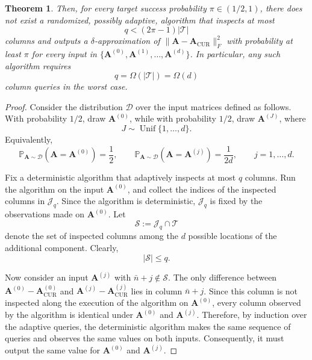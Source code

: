\documentclass[10pt,a4paper]{amsart}
\newtheorem{theorem}{Theorem}
\begin{document}
\begin{theorem}
    Then, for every target success probability $\pi\in(1/2,1)$, there does not
    exist a randomized, possibly adaptive, algorithm that inspects at most
    \begin{equation}
        q < (2\pi-1)|\mathcal{T}|
    \end{equation}
    columns and outputs a $\delta$-approximation of
    $\|\mathbf{A}-\mathbf{A}_{\mathrm{CUR}}\|_F^2$ with probability at least
    $\pi$ for every input in
    $\{\mathbf{A}^{(0)},\mathbf{A}^{(1)},\ldots,\mathbf{A}^{(d)}\}$.
    In particular, any such algorithm requires
    $$
        q=\Omega(|\mathcal{T}|)=\Omega(d)
    $$
    column queries in the worst case.
\end{theorem}

\begin{proof}
    Consider the distribution $\mathcal{D}$ over the input matrices defined as
    follows. With probability $1/2$, draw $\mathbf{A}^{(0)}$, while with
    probability $1/2$, draw $\mathbf{A}^{(J)}$, where
    \begin{equation}
        J\sim\operatorname{Unif}\{1,\ldots,d\}.
    \end{equation}
    Equivalently,
    \begin{equation}
        \mathbb{P}_{\mathbf{A}\sim\mathcal{D}}
        \left(\mathbf{A}=\mathbf{A}^{(0)}\right)
        =\frac{1}{2},
        \qquad
        \mathbb{P}_{\mathbf{A}\sim\mathcal{D}}
        \left(\mathbf{A}=\mathbf{A}^{(j)}\right)
        =\frac{1}{2d},
        \qquad j=1,\ldots,d.
    \end{equation}

    Fix a deterministic algorithm that adaptively inspects at most $q$ columns.
    Run the algorithm on the input $\mathbf{A}^{(0)}$, and collect the indices
    of the inspected columns in $\mathcal{J}_q$. Since the algorithm is
    deterministic, $\mathcal{J}_q$ is fixed by the observations made on
    $\mathbf{A}^{(0)}$. Let
    \begin{equation}
        \mathcal{S}
        :=
        \mathcal{J}_q\cap\mathcal{T}
    \end{equation}
    denote the set of inspected columns among the $d$ possible locations of the
    additional component. Clearly,
    \begin{equation}
        |\mathcal{S}|\leq q.
    \end{equation}

    Now consider an input $\mathbf{A}^{(j)}$ with
    $\bar n+j\notin\mathcal{S}$. The only difference between
    $\mathbf{A}^{(0)}-\mathbf{A}^{(0)}_{\mathrm{CUR}}$ and
    $\mathbf{A}^{(j)}-\mathbf{A}^{(j)}_{\mathrm{CUR}}$ lies in column
    $\bar n+j$. Since this column is not inspected along the execution of the
    algorithm on $\mathbf{A}^{(0)}$, every column observed by the algorithm is
    identical under $\mathbf{A}^{(0)}$ and $\mathbf{A}^{(j)}$. Therefore, by
    induction over the adaptive queries, the deterministic algorithm makes the
    same sequence of queries and observes the same values on both inputs.
    Consequently, it must output the same value for $\mathbf{A}^{(0)}$ and
    $\mathbf{A}^{(j)}$.


\end{proof}
\end{document}
